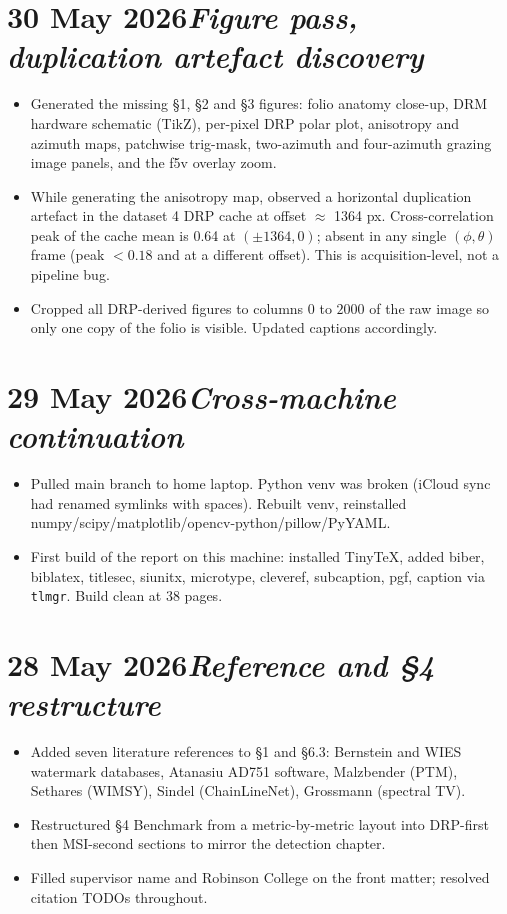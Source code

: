 \documentclass[11pt,a4paper]{article}
\newcommand{\logentry}[2]{\section*{#1\hfill\normalfont\normalsize\textit{#2}}}
\begin{document}
\logentry{30 May 2026}{Figure pass, duplication artefact discovery}
\begin{itemize}
  \item Generated the missing \S 1, \S 2 and \S 3 figures: folio anatomy close-up, DRM hardware schematic (TikZ), per-pixel DRP polar plot, anisotropy and azimuth maps, patchwise trig-mask, two-azimuth and four-azimuth grazing image panels, and the f5v overlay zoom.
  \item While generating the anisotropy map, observed a horizontal duplication artefact in the dataset 4 DRP cache at offset $\approx$ 1364 px. Cross-correlation peak of the cache mean is 0.64 at $(\pm 1364, 0)$; absent in any single $(\phi, \theta)$ frame (peak $<0.18$ and at a different offset). This is acquisition-level, not a pipeline bug.
  \item Cropped all DRP-derived figures to columns $0$ to $2000$ of the raw image so only one copy of the folio is visible. Updated captions accordingly.
\end{itemize}

\logentry{29 May 2026}{Cross-machine continuation}
\begin{itemize}
  \item Pulled main branch to home laptop. Python venv was broken (iCloud sync had renamed symlinks with spaces). Rebuilt venv, reinstalled numpy/scipy/matplotlib/opencv-python/pillow/PyYAML.
  \item First build of the report on this machine: installed TinyTeX, added biber, biblatex, titlesec, siunitx, microtype, cleveref, subcaption, pgf, caption via \texttt{tlmgr}. Build clean at 38 pages.
\end{itemize}

\logentry{28 May 2026}{Reference and \S 4 restructure}
\begin{itemize}
  \item Added seven literature references to \S 1 and \S 6.3: Bernstein and WIES watermark databases, Atanasiu AD751 software, Malzbender (PTM), Sethares (WIMSY), Sindel (ChainLineNet), Grossmann (spectral TV).
  \item Restructured \S 4 Benchmark from a metric-by-metric layout into DRP-first then MSI-second sections to mirror the detection chapter.
  \item Filled supervisor name and Robinson College on the front matter; resolved citation TODOs throughout.
\end{itemize}
\end{document}

